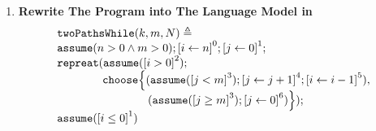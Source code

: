 \begin{enumerate}
  \item \textbf{Rewrite The Program into The Language Model in~\cite{GulwaniJK09}}
  \[
    \begin{array}{l}
      \kw{twoPathsWhile}(k, m, N) \triangleq \\
      \rpasum(n > 0 \land m > 0);
      \clabel{ \assign{i}{n} }^{0} ; 
      \clabel{ \assign{j}{0} }^{1} ; \\
      \rprepeat(\rpasum(\clabel{i > 0}^{2}); \\
      \qquad \qquad \rpchoose\Big\{ 
        (\rpasum(\clabel{j < m}^{3}); \clabel{\assign{j}{j + 1}}^{4}; 
      \clabel{\assign{i}{i - 1}}^{5}),\\
      \qquad \qquad \qquad \qquad(\rpasum(\clabel{j \geq m}^{3}); \clabel{\assign{j}{0}}^{6})\Big\}
      );\\
      \rpasum(\clabel{i \leq 0}^{1})
      \end{array}
    \]


\end{enumerate}
